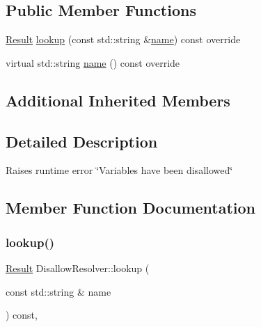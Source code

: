 \subsection*{Public Member Functions}
\begin{DoxyCompactItemize}
\item 
\hyperlink{classtheoria_1_1config_1_1ConfigVariableResolver_af27a85262d802c9ad4ecb1179efaf447}{Result} \hyperlink{classtheoria_1_1config_1_1DisallowResolver_a70db68fce5348edea51d7303f2bb3f33}{lookup} (const std\+::string \&\hyperlink{classtheoria_1_1config_1_1DisallowResolver_a8352df79f9e0f17fbfad8801bfdcc99e}{name}) const override
\item 
virtual std\+::string \hyperlink{classtheoria_1_1config_1_1DisallowResolver_a8352df79f9e0f17fbfad8801bfdcc99e}{name} () const override
\end{DoxyCompactItemize}
\subsection*{Additional Inherited Members}


\subsection{Detailed Description}
Raises runtime error \char`\"{}\+Variables have been disallowed\char`\"{} 

\subsection{Member Function Documentation}
\mbox{\label{classtheoria_1_1config_1_1DisallowResolver_a70db68fce5348edea51d7303f2bb3f33}} 
\subsubsection{\texorpdfstring{lookup()}{lookup()}}
{\footnotesize\ttfamily \hyperlink{classtheoria_1_1config_1_1ConfigVariableResolver_af27a85262d802c9ad4ecb1179efaf447}{Result} Disallow\+Resolver\+::lookup (\begin{DoxyParamCaption}\item[{const std\+::string \&}]{name }\end{DoxyParamCaption}) const\hspace{0.3cm}{\ttfamily [override]}, {\ttfamily [virtual]}}

